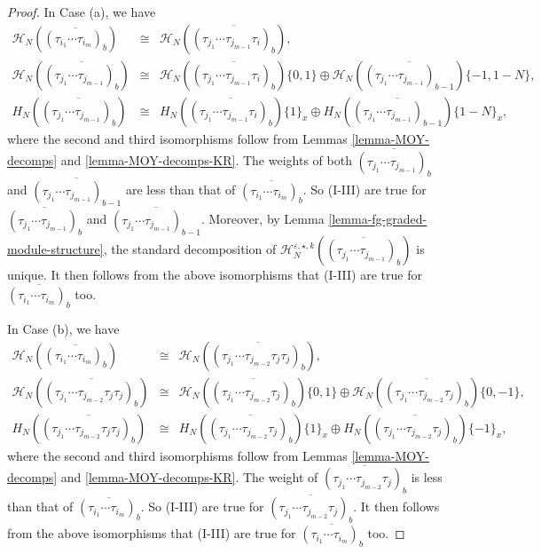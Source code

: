 \documentclass{amsart}
\theoremstyle{plain}
\theoremstyle{definition}
\theoremstyle{remark}
\numberwithin{equation}{section}
\begin{document}
\begin{proof}
In Case (a), we have
\begin{eqnarray*}
{\mathcal{H}}_N(\overline{(\tau_{i_1}\cdots\tau_{i_m})_b}) & \cong & {\mathcal{H}}_N(\overline{(\tau_{j_1}\cdots\tau_{j_{m-1}}\tau_i)_b}), \\
{\mathcal{H}}_N(\overline{(\tau_{j_1}\cdots\tau_{j_{m-1}})_b}) & \cong & {\mathcal{H}}_N(\overline{(\tau_{j_1}\cdots\tau_{j_{m-1}}\tau_i)_b})\{0,1\} \oplus {\mathcal{H}}_N(\overline{(\tau_{j_1}\cdots\tau_{j_{m-1}})_{b-1}})\{-1,1-N\}, \\
H_N(\overline{(\tau_{j_1}\cdots\tau_{j_{m-1}})_b}) & \cong & H_N(\overline{(\tau_{j_1}\cdots\tau_{j_{m-1}}\tau_i)_b})\{1\}_x \oplus H_N(\overline{(\tau_{j_1}\cdots\tau_{j_{m-1}})_{b-1}})\{1-N\}_x,
\end{eqnarray*}
where the second and third isomorphisms follow from Lemmas \ref{lemma-MOY-decomps} and \ref{lemma-MOY-decomps-KR}. The weights of both $\overline{(\tau_{j_1}\cdots\tau_{j_{m-1}})_b}$ and $\overline{(\tau_{j_1}\cdots\tau_{j_{m-1}})_{b-1}}$ are less than that of $\overline{(\tau_{i_1}\cdots\tau_{i_m})_b}$. So (I-III) are true for $\overline{(\tau_{j_1}\cdots\tau_{j_{m-1}})_b}$ and $\overline{(\tau_{j_1}\cdots\tau_{j_{m-1}})_{b-1}}$. Moreover, by Lemma \ref{lemma-fg-graded-module-structure}, the standard decomposition of ${\mathcal{H}}_N^{{\varepsilon},\star,k}(\overline{(\tau_{j_1}\cdots\tau_{j_{m-1}})_b})$ is unique. It then follows from the above isomorphisms that (I-III) are true for $\overline{(\tau_{i_1}\cdots\tau_{i_m})_b}$ too.

In Case (b), we have
\begin{eqnarray*}
{\mathcal{H}}_N(\overline{(\tau_{i_1}\cdots\tau_{i_m})_b}) & \cong & {\mathcal{H}}_N(\overline{(\tau_{j_1}\cdots\tau_{j_{m-2}}\tau_j\tau_j)_b}), \\
{\mathcal{H}}_N(\overline{(\tau_{j_1}\cdots\tau_{j_{m-2}}\tau_j\tau_j)_b}) & \cong & {\mathcal{H}}_N(\overline{(\tau_{j_1}\cdots\tau_{j_{m-2}}\tau_j)_b})\{0,1\} \oplus {\mathcal{H}}_N(\overline{(\tau_{j_1}\cdots\tau_{j_{m-2}}\tau_j)_b}) \{0,-1\}, \\
H_N(\overline{(\tau_{j_1}\cdots\tau_{j_{m-2}}\tau_j\tau_j)_b}) & \cong & H_N(\overline{(\tau_{j_1}\cdots\tau_{j_{m-2}}\tau_j)_b})\{1\}_x \oplus H_N(\overline{(\tau_{j_1}\cdots\tau_{j_{m-2}}\tau_j)_b}) \{-1\}_x,
\end{eqnarray*}
where the second and third isomorphisms follow from Lemmas \ref{lemma-MOY-decomps} and \ref{lemma-MOY-decomps-KR}. The weight of $\overline{(\tau_{j_1}\cdots\tau_{j_{m-2}}\tau_j)_b}$ is less than that of $\overline{(\tau_{i_1}\cdots\tau_{i_m})_b}$. So (I-III) are true for $\overline{(\tau_{j_1}\cdots\tau_{j_{m-2}}\tau_j)_b}$. It then follows from the above isomorphisms that (I-III) are true for $\overline{(\tau_{i_1}\cdots\tau_{i_m})_b}$ too.


\end{proof}
\end{document}
